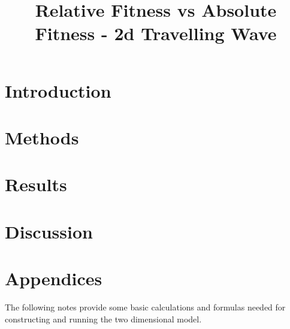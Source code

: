\documentclass{article}
\begin{document}
\title{Relative Fitness vs Absolute Fitness - 2d Travelling Wave}

\section*{Introduction}
\section*{Methods}
\section*{Results}
\section*{Discussion}

\section*{Appendices}
The following notes provide some basic calculations and formulas needed for constructing and running the two dimensional model.
\end{document}
